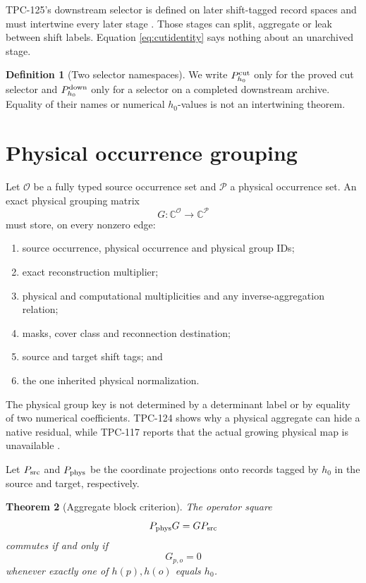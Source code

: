 \documentclass[11pt]{article}
\newtheorem{theorem}{Theorem}[section]
\theoremstyle{definition}
\newtheorem{definition}[theorem]{Definition}
\theoremstyle{remark}
\begin{document}
TPC-125's downstream selector is defined on later shift-tagged record
spaces and must intertwine every later stage \citep{WangTPC125}.
Those stages can split, aggregate or leak between shift labels.
Equation \eqref{eq:cutidentity} says nothing about an unarchived
stage.

\begin{definition}[Two selector namespaces]
We write \(P_{h_0}^{\rm cut}\) only for the proved cut selector and
\(P_{h_0}^{\rm down}\) only for a selector on a completed downstream
archive.  Equality of their names or numerical \(h_0\)-values is not
an intertwining theorem.
\end{definition}

\section{Physical occurrence grouping}

Let \(\mathcal O\) be a fully typed source occurrence set and
\(\mathcal P\) a physical occurrence set.  An exact physical
grouping matrix
\[
 G:\mathbb C^{\mathcal O}\longrightarrow\mathbb C^{\mathcal P}
\]
must store, on every nonzero edge:
\begin{enumerate}[label=(\roman*),leftmargin=2.2em]
\item source occurrence, physical occurrence and physical group IDs;
\item exact reconstruction multiplier;
\item physical and computational multiplicities and any
inverse-aggregation relation;
\item masks, cover class and reconnection destination;
\item source and target shift tags; and
\item the one inherited physical normalization.
\end{enumerate}

The physical group key is not determined by a determinant label or
by equality of two numerical coefficients.  TPC-124 shows why a
physical aggregate can hide a native residual, while TPC-117 reports
that the actual growing physical map is unavailable
\citep{WangTPC117,WangTPC124}.

Let \(P_{\rm src}\) and \(P_{\rm phys}\) be the coordinate
projections onto records tagged by \(h_0\) in the source and target,
respectively.

\begin{theorem}[Aggregate block criterion]
\label{thm:aggregate}
The operator square
\begin{equation}
 P_{\rm phys}G=GP_{\rm src}
 \label{eq:square}
\end{equation}
commutes if and only if
\[
 G_{p,o}=0
\]
whenever exactly one of \(h(p),h(o)\) equals \(h_0\).
\end{theorem}
\end{document}
